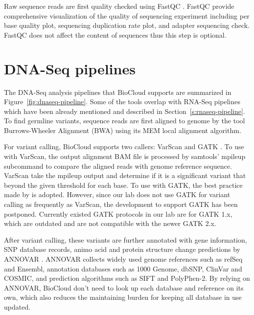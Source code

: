 Raw sequence reads are first quality checked using FastQC \cite{:fastqc}.
FastQC provide comprehensive visualization of the quality of sequencing
experiment including per base quality plot, sequencing duplication rate plot,
and adapter sequencing check. FastQC does not affect the content of sequences
thus this step is optional.



\section{DNA-Seq pipelines}
\label{s:dnaseq-pipeline}

The DNA-Seq analysis pipelines that BioCloud supports are summarized in
Figure~\ref{fig:dnaseq-pipeline}. Some of the tools overlap with RNA-Seq
pipelines which have been already mentioned and described in
Section~\ref{s:rnaseq-pipeline}. To find germline variants, sequence reads are
first aligned to genome by the tool Burrows-Wheeler Alignment (BWA)
\cite{li2009:fast} using its MEM local alignment algorithm.



For variant calling, BioCloud supports two callers: VarScan
\cite{koboldt2012:varscan} and GATK
\cite{vanderauwera2013:fastq,mckenna2010:genome}. To use with VarScan, the
output alignment BAM file is processed by samtools' mpileup subcommand to
compare the aligned reads with genome reference sequence. VarScan take the
mpileup output and determine if it is a significant variant that beyond the
given threshold for each base. To use with GATK, the best practice
\cite{vanderauwera2013:fastq} made by \citeauthor{vanderauwera2013:fastq} is
adopted. However, since our lab does not use GATK for variant calling as
frequently as VarScan, the development to support GATK has been postponed.
Currently existed GATK protocols in our lab are for GATK 1.x, which are
outdated and are not compatible with the newer GATK 2.x.

After variant calling, these variants are further annotated with gene
information, SNP database records, animo acid and protein structure change
predictions by ANNOVAR \cite{wang2010:annovar}. ANNOVAR collects widely used
genome references such as refSeq and Ensembl, annotation databases such as 1000
Genome, dbSNP, ClinVar and COSMIC, and prediction algorithms such as SIFT and
PolyPhen-2. By relying on ANNOVAR, BioCloud don't need to look up each database
and reference on its own, which also reduces the maintaining burden for keeping
all database in use updated.



